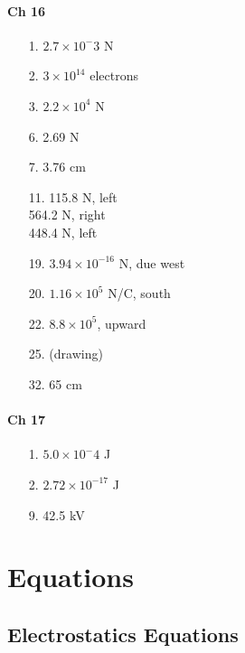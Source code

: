 \documentclass[10pt]{exam}
\begin{document}
\begin{multicols}{3}

  \paragraph{Ch 16}

  \begin{itemize}[noitemsep]
    \item[1.] $2.7 \times 10^-3$ N
    \item[2.] $3 \times 10^{14}$ electrons
    \item[3.] $2.2 \times 10^4$ N
    \item[6.] 2.69 N 
    \item[7.] 3.76 cm
    \item[11.] 115.8 N, left \\
               564.2 N, right \\
               448.4 N, left
    \item[19.] $3.94 \times 10^{-16}$ N, due west
    \item[20.] $1.16 \times 10^5$ N/C, south
    \item[22.] $8.8 \times 10^5$, upward
    \item[25.] (drawing)
    \item[32.] 65 cm
  \end{itemize}

  \paragraph{Ch 17}

  \begin{itemize}[noitemsep]
    \item[1.] $5.0 \times 10^-4$ J
    \item[2.] $2.72 \times 10^{-17}$ J
    \item[9.] 42.5 kV
  \end{itemize}

\end{multicols}




\pagebreak
\section*{Equations}
\subsection*{Electrostatics Equations}
\end{document}
